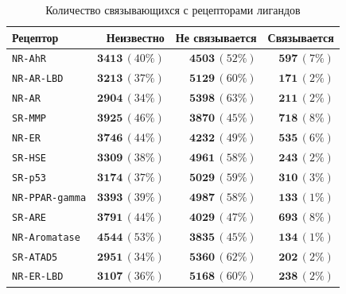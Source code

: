 \documentclass{ITaSconf}
\newcommand\headline{\hline}
\begin{document}
\begin{table}[p]%
	\caption{Количество связывающихся с рецепторами лигандов}
	\label{t:dataDescr}
	\centering\medskip%
	\begin{tabular}{lrrr}
		\headline
		
		Рецептор
		
		& Неизвестно
		& Не связывается
		& Связывается\\
		
		\headline
		{\tt NR-AhR}
		& $\mathbf{3413}\, (40 \%)$
		& $\mathbf{4503}\, (52 \%)$
		& $\mathbf{597}\, (7 \%)$\\
		
		{\tt NR-AR-LBD}
		& $\mathbf{3213}\, (37 \%)$
		& $\mathbf{5129}\, (60 \%)$
		& $\mathbf{171}\, (2 \%)$\\
		
		{\tt NR-AR}
		& $\mathbf{2904}\, (34 \%)$
		& $\mathbf{5398}\, (63 \%)$
		& $\mathbf{211}\, (2 \%)$\\
		
		{\tt SR-MMP}
		& $\mathbf{3925}\, (46 \%)$
		& $\mathbf{3870}\, (45 \%)$
		& $\mathbf{718}\, (8 \%)$\\
		
		{\tt NR-ER}
		& $\mathbf{3746}\, (44 \%)$
		& $\mathbf{4232}\, (49 \%)$
		& $\mathbf{535}\, (6 \%)$\\
		
		{\tt SR-HSE}
		& $\mathbf{3309}\, (38 \%)$
		& $\mathbf{4961}\, (58 \%)$
		& $\mathbf{243}\, (2 \%)$\\
		
		{\tt SR-p53}
		& $\mathbf{3174}\, (37 \%)$
		& $\mathbf{5029}\, (59 \%)$
		& $\mathbf{310}\, (3 \%)$\\
		
		{\tt NR-PPAR-gamma}
		& $\mathbf{3393}\, (39 \%)$
		& $\mathbf{4987}\, (58 \%)$
		& $\mathbf{133}\, (1 \%)$\\
		
		{\tt SR-ARE}
		& $\mathbf{3791}\, (44 \%)$
		& $\mathbf{4029}\, (47 \%)$
		& $\mathbf{693}\, (8 \%)$\\
		
		{\tt NR-Aromatase}
		& $\mathbf{4544}\, (53 \%)$
		& $\mathbf{3835}\, (45 \%)$
		& $\mathbf{134}\, (1 \%)$\\
		
		{\tt SR-ATAD5}
		& $\mathbf{2951}\, (34 \%)$
		& $\mathbf{5360}\, (62 \%)$
		& $\mathbf{202}\, (2 \%)$\\
		
		{\tt NR-ER-LBD}
		& $\mathbf{3107}\, (36 \%)$
		& $\mathbf{5168}\, (60 \%)$
		& $\mathbf{238}\, (2 \%)$\\
		\hline
	\end{tabular}
\end{table}
\end{document}
